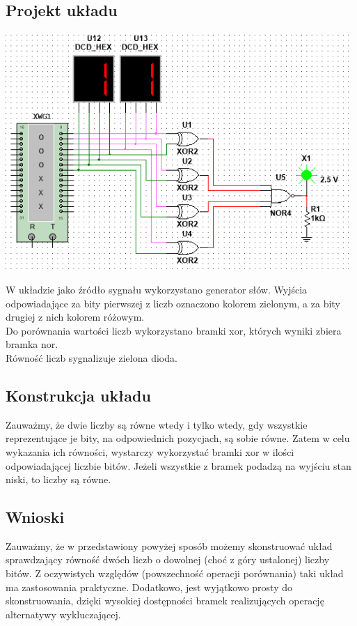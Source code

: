 \documentclass{article}
\begin{document}
        \subsection{Projekt układu}
            \begin{center}
                \includegraphics[height=9cm]{reports/img/Z1B_1.png}\\
            \end{center}
            W układzie jako źródło sygnału wykorzystano generator słów. Wyjścia odpowiadające za bity pierwszej z liczb oznaczono kolorem zielonym, a za bity drugiej z nich kolorem różowym. \\
            Do porównania wartości liczb wykorzystano bramki xor, których wyniki zbiera bramka nor. \\
            Równość liczb sygnalizuje zielona dioda. 
            \FloatBarrier
        \subsection{Konstrukcja układu}
            Zauważmy, że dwie liczby są równe wtedy i tylko wtedy, gdy wszystkie reprezentujące je bity, na odpowiednich pozycjach, są sobie równe. Zatem w celu wykazania ich równości, wystarczy wykorzystać bramki xor w ilości odpowiadającej liczbie bitów. Jeżeli wszystkie z bramek podadzą na wyjściu stan niski, to liczby są równe.
            
        \subsection{Wnioski}
            Zauważmy, że w przedstawiony powyżej sposób możemy skonstruować układ sprawdzający równość  dwóch liczb o dowolnej (choć z góry ustalonej) liczby bitów. Z oczywistych względów (powszechność operacji porównania) taki układ ma zastosowania praktyczne. Dodatkowo, jest wyjątkowo prosty do skonstruowania, dzięki wysokiej dostępności bramek realizujących operację alternatywy wykluczającej. 
    
\end{document}
